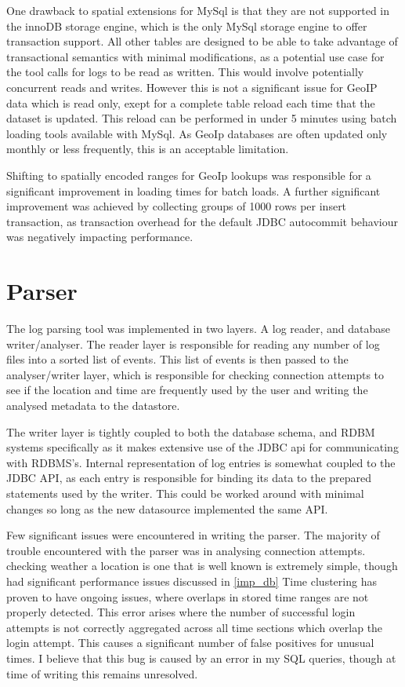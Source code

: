 One drawback to spatial extensions for MySql is that they are not supported in the innoDB storage engine, which is the only MySql storage engine to offer transaction support. All other tables are designed to be able to take advantage of transactional semantics with minimal modifications, as a potential use case for the tool calls for logs to be read as written. This would involve potentially concurrent reads and writes. However this is not a significant issue for GeoIP data which is read only, exept for a complete table reload each time that the dataset is updated. This reload can be performed in under 5 minutes using batch loading tools available with MySql. As GeoIp databases are often updated only monthly or less frequently, this is an acceptable limitation. 

Shifting to spatially encoded ranges for GeoIp lookups was responsible for a significant improvement in loading times for batch loads. A further significant improvement was achieved by collecting groups of 1000 rows per insert transaction, as transaction overhead for the default JDBC autocommit behaviour was negatively impacting performance. 
 
\section{Parser}

The log parsing tool was implemented in two layers. A log reader, and database writer/analyser. 
The reader layer is responsible for reading any number of log files into a sorted list of events.
This list of events is then passed to the analyser/writer layer, which is responsible for checking connection attempts to see if the location and time are frequently used by the user and writing the analysed metadata to the datastore.

The writer layer is tightly coupled to both the database schema, and RDBM systems specifically as it makes extensive use of the JDBC api for communicating with RDBMS's.
Internal representation of log entries is somewhat coupled to the JDBC API, as each entry is responsible for binding its data to the prepared statements used by the writer.
This could be worked around with minimal changes so long as the new datasource implemented the same API.

Few significant issues were encountered in writing the parser. 
The majority of trouble encountered with the parser was in analysing connection attempts. checking weather a location  is one that is well known is extremely simple, though had significant performance issues discussed in \ref{imp_db}
Time clustering has proven to have ongoing issues, where overlaps in stored time ranges are not properly detected. This error arises where the number of successful login attempts is not correctly aggregated across all time sections which overlap the login attempt. This causes a significant number of false positives for unusual times. I believe that this bug is caused by an error in my SQL queries, though at time of writing this remains unresolved. 

